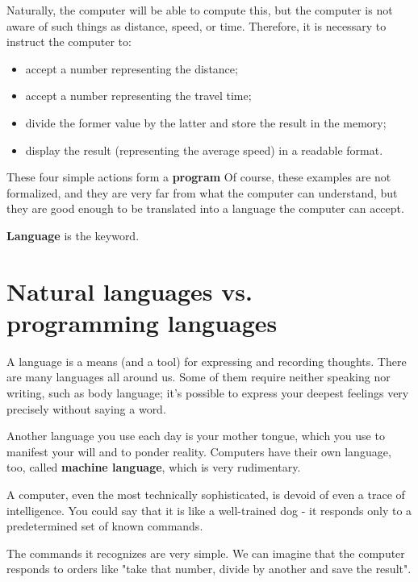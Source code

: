 \documentclass[a4paper,10pt]{article}
\begin{document}
Naturally, the computer will be able to compute this, but the computer is not aware of such things as distance, speed, or time. Therefore, it is necessary to instruct the computer to:
\begin{itemize}
    \item accept a number representing the distance;
    \item accept a number representing the travel time;
    \item divide the former value by the latter and store the result in the memory;
    \item display the result (representing the average speed) in a readable format.
\end{itemize}

These four simple actions form a \textbf{program} Of course, these examples are not formalized, and they are very far from what the computer can understand, but they are good enough to be translated into a language the computer can accept.
\newline

\textbf{Language} is the keyword.

\section{Natural languages vs. programming languages}
A language is a means (and a tool) for expressing and recording thoughts. There are many languages all around us. Some of them require neither speaking nor writing, such as body language; it's possible to express your deepest feelings very precisely without saying a word.
\newline

Another language you use each day is your mother tongue, which you use to manifest your will and to ponder reality. Computers have their own language, too, called \textbf{machine language}, which is very rudimentary.
\newline

A computer, even the most technically sophisticated, is devoid of even a trace of intelligence. You could say that it is like a well-trained dog - it responds only to a predetermined set of known commands.
\newline

The commands it recognizes are very simple. We can imagine that the computer responds to orders like "take that number, divide by another and save the result".
\newline
\end{document}
